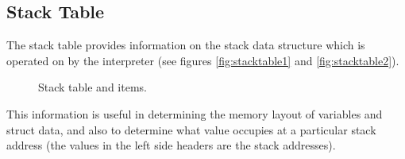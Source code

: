 \documentclass[a4paper,11pt]{article}
\begin{document}
\subsection{Stack Table}

The stack table provides information on the stack data structure which is operated on by the interpreter (see figures \ref{fig:stacktable1} and \ref{fig:stacktable2}).
\begin{figure}[h!]
\centering
{}
\hspace{10pt}
\caption{Stack table and items.}
\end{figure}
This information is useful in determining the memory layout of variables and struct data, and also to determine what value occupies at a particular stack address (the values in the left side headers are the stack addresses).
\end{document}
